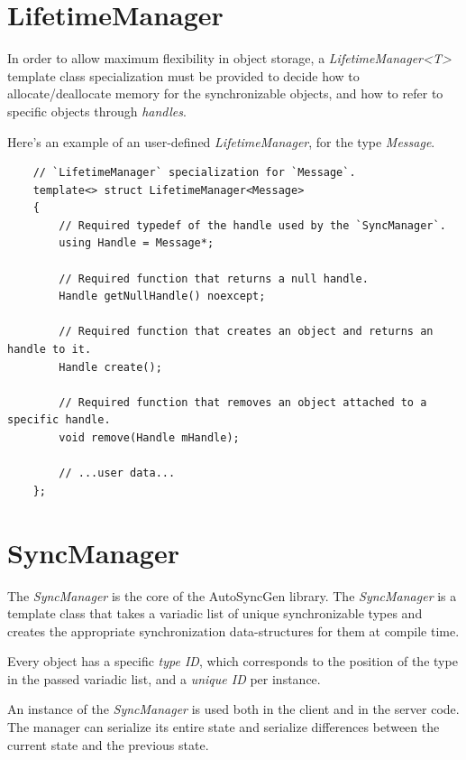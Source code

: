 \documentclass{report}
\begin{document}
        \section{LifetimeManager}

            In order to allow maximum flexibility in object storage, a \emph{LifetimeManager<T>} template class specialization must be provided to decide how to allocate/deallocate memory for the synchronizable objects, and how to refer to specific objects through \emph{handles}.

            Here's an example of an user-defined \emph{LifetimeManager}, for the type \emph{Message}.

\begin{verbatim}
    // `LifetimeManager` specialization for `Message`.
    template<> struct LifetimeManager<Message>
    {
        // Required typedef of the handle used by the `SyncManager`.
        using Handle = Message*;

        // Required function that returns a null handle.
        Handle getNullHandle() noexcept;

        // Required function that creates an object and returns an handle to it.
        Handle create();

        // Required function that removes an object attached to a specific handle.
        void remove(Handle mHandle);
        
        // ...user data...
    };
\end{verbatim}

        \section{SyncManager}

            The \emph{SyncManager} is the core of the AutoSyncGen library. 
            The \emph{SyncManager} is a template class that takes a variadic list of unique synchronizable types and creates the appropriate synchronization data-structures for them at compile time.

            Every object has a specific \emph{type ID}, which corresponds to the position of the type in the passed variadic list, and a \emph{unique ID} per instance.

            An instance of the \emph{SyncManager} is used both in the client and in the server code. The manager can serialize its entire state and serialize differences between the current state and the previous state.
\end{document}
